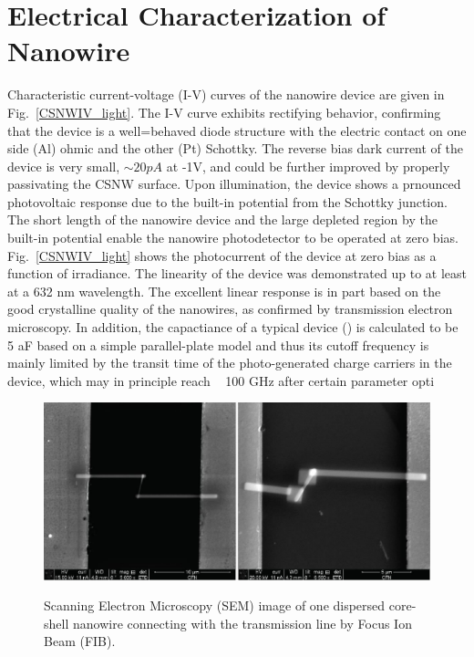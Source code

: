 \section{Electrical Characterization of Nanowire}

Characteristic current-voltage (I-V) curves of the nanowire device are given in
Fig.~\ref{CSNWIV_light}. The I-V curve exhibits rectifying behavior, confirming
that the device is a well=behaved diode structure with the electric contact on
one side (Al) ohmic and the other (Pt) Schottky. The reverse bias dark current
of the device is very small, $\sim20pA$ at -1V, and could be further improved
by properly passivating the CSNW surface. Upon illumination, the device shows a
prnounced photovoltaic response due to the built-in potential from the Schottky
junction. The short length of the nanowire device and the large depleted region
by the built-in potential enable the nanowire photodetector to be operated at
zero bias. Fig.~\ref{CSNWIV_light} shows the photocurrent of the device at zero
bias as a function of irradiance. The linearity of the device was demonstrated
up to at least at a 632 nm wavelength. The excellent linear response is in part
based on the good crystalline quality of the nanowires, as confirmed by
transmission electron microscopy. In addition, the capactiance of a typical
device () is calculated to be 5 aF based on a simple parallel-plate model and
thus its cutoff frequency is mainly limited by the transit time of the
photo-generated charge carriers in the device, which may in principle reach ~
100 GHz after certain parameter opti 

\begin{figure}
  \caption{Scanning Electron Microscopy (SEM) image of one dispersed core-shell nanowire connecting with the transmission line by Focus Ion Beam (FIB).}
  \centering
  \includegraphics[width=\textwidth]{pictures/Data/ContactNW}
  \label{ContactNW}
\end{figure}

